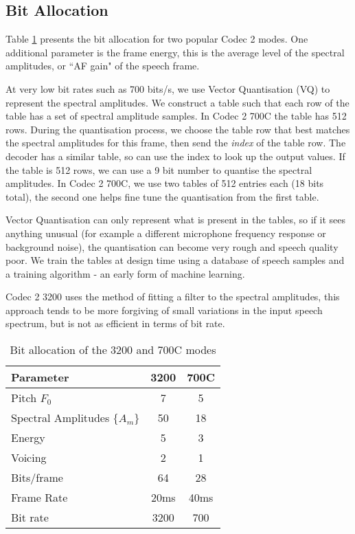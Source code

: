 \documentclass{article}
\begin{document}
\subsection{Bit Allocation}

Table \ref{tab:bit_allocation} presents the bit allocation for two popular Codec 2 modes.  One additional parameter is the frame energy, this is the average level of the spectral amplitudes, or ``AF gain" of the speech frame.

At very low bit rates such as 700 bits/s, we use Vector Quantisation (VQ) to represent the spectral amplitudes.  We construct a table such that each row of the table has a set of spectral amplitude samples.  In Codec 2 700C the table has 512 rows.  During the quantisation process, we choose the table row that best matches the spectral amplitudes for this frame, then send the \emph{index} of the table row.  The decoder has a similar table, so can use the index to look up the output values.  If the table is 512 rows, we can use a 9 bit number to quantise the spectral amplitudes.  In Codec 2 700C, we use two tables of 512 entries each (18 bits total), the second one helps fine tune the quantisation from the first table.

Vector Quantisation can only represent what is present in the tables, so if it sees anything unusual (for example a different microphone frequency response or background noise), the quantisation can become very rough and speech quality poor.  We train the tables at design time using a database of speech samples and a training algorithm - an early form of machine learning.

Codec 2 3200 uses the method of fitting a filter to the spectral amplitudes, this approach tends to be more forgiving of small variations in the input speech spectrum, but is not as efficient in terms of bit rate.

\begin{table}[H]
\label{tab:bit_allocation}
\centering
\begin{tabular}{l c c }
\hline
Parameter & 3200 & 700C \\
\hline
Pitch $F_0$ & 7 & 5 \\
Spectral Amplitudes $\{A_m\}$ & 50 & 18 \\
Energy & 5 & 3 \\
Voicing & 2 & 1 \\
Bits/frame & 64 & 28 \\
Frame Rate & 20ms & 40ms \\
Bit rate & 3200 & 700 \\
\hline
\end{tabular}
\caption{Bit allocation of the 3200 and 700C modes}
\end{table}
\end{document}
